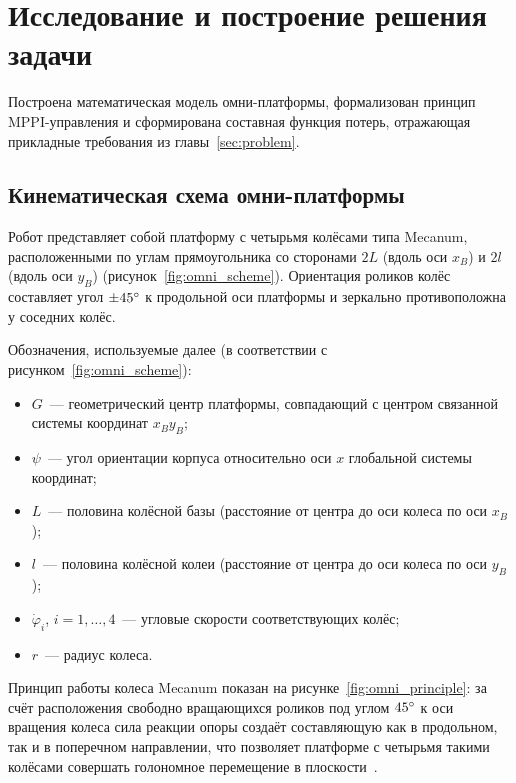 \section{Исследование и построение решения задачи}
\label{sec:solution}

Построена математическая модель омни-платформы, формализован
принцип MPPI-управления и сформирована составная функция потерь,
отражающая прикладные требования из главы~\ref{sec:problem}.

\subsection{Кинематическая схема омни-платформы}

Робот представляет собой платформу с четырьмя колёсами типа Mecanum,
расположенными по углам прямоугольника со сторонами $2L$ (вдоль оси
$x_B$) и $2l$ (вдоль оси $y_B$) (рисунок~\ref{fig:omni_scheme}).
Ориентация роликов колёс составляет угол $\pm 45\degree{}$ к продольной оси платформы и
зеркально противоположна у соседних колёс.


Обозначения, используемые далее (в соответствии с
рисунком~\ref{fig:omni_scheme}):
\begin{itemize}
    \item $G$~--- геометрический центр платформы, совпадающий с центром
          связанной системы координат $x_B y_B$;
    \item $\psi$~--- угол ориентации корпуса относительно оси $x$
          глобальной системы координат;
    \item $L$~--- половина колёсной базы (расстояние от центра до оси
          колеса по оси $x_B$);
    \item $l$~--- половина колёсной колеи (расстояние от центра до оси
          колеса по оси $y_B$);
    \item $\dot{\varphi}_i$, $i = 1,\dots,4$~--- угловые скорости
          соответствующих колёс;
    \item $r$~--- радиус колеса.
\end{itemize}

Принцип работы колеса Mecanum показан на
рисунке~\ref{fig:omni_principle}: за счёт расположения свободно
вращающихся роликов под углом $45\degree{}$ к оси вращения колеса
сила реакции опоры создаёт составляющую как в продольном, так и в
поперечном направлении, что позволяет платформе с четырьмя такими
колёсами совершать голономное перемещение в плоскости~\cite{MorenoCaireta2020MPC}.

